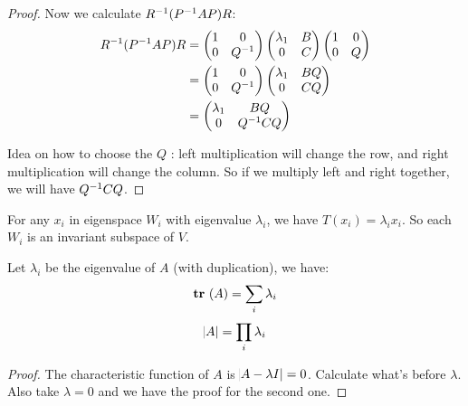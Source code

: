 \begin{proof}
    Now we calculate ${R}^{-1} ({P}^{-1} A P) R$:
    \begin{equation*}
        \begin{aligned}
            {R}^{-1} ({P}^{-1} A P) R  &= \begin{pmatrix}
                1 & 0 \\
                0 & {Q}^{-1}
            \end{pmatrix} \begin{pmatrix}
                \lambda_1 & B \\
                0 & C
            \end{pmatrix} \begin{pmatrix}
                1 & 0 \\
                0 & Q
            \end{pmatrix} \\
            & = \begin{pmatrix}
                1 & 0 \\
                0 & {Q}^{-1}
            \end{pmatrix} \begin{pmatrix}
                \lambda_1 & B Q \\
                0 & C Q
            \end{pmatrix} \\
            &= \begin{pmatrix}
                \lambda_1 & BQ \\
                0 & {Q}^{-1} C Q
            \end{pmatrix}
        \end{aligned}     
    \end{equation*}
    
    Idea on how to choose the $Q$ : left multiplication will change the row, and right multiplication will change the column. So if we multiply left and right together, we will have ${Q}^{-1} C Q$.
\end{proof}

\begin{theorem}
    For any $x_i$ in eigenspace $W_i$ with eigenvalue $\lambda_i$, we have $T(x_i) = \lambda_i x_i$. So each $W_i$ is an invariant subspace of $V$.
\end{theorem}

\begin{theorem}
    Let $\lambda_i$ be the eigenvalue of $A$ (with duplication), we have:
    \begin{equation}
        \displaystyle \mathop{\bf tr\/}~( A ) = \sum_i \lambda_i
    \end{equation}
    \begin{equation}
        \abs{A} = \prod_i \lambda_i
    \end{equation}
\end{theorem}
\begin{proof}
    The characteristic function of $A$ is $\abs{A - \lambda I} = 0$. Calculate what's before $\lambda$. Also take $\lambda=0$ and we have the proof for the second one.
\end{proof}


